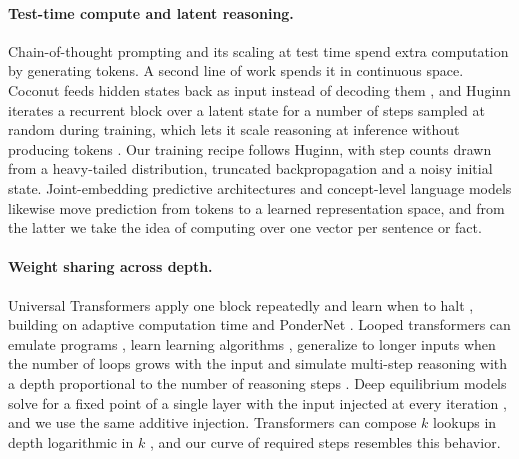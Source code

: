 \documentclass{article}
\begin{document}
\paragraph{Test-time compute and latent reasoning.} Chain-of-thought prompting \cite{wei2022chain} and its scaling at test time \cite{snell2024scaling} spend extra computation by generating tokens. A second line of work spends it in continuous space. Coconut feeds hidden states back as input instead of decoding them \cite{hao2024coconut}, and Huginn iterates a recurrent block over a latent state for a number of steps sampled at random during training, which lets it scale reasoning at inference without producing tokens \cite{geiping2025scaling}. Our training recipe follows Huginn, with step counts drawn from a heavy-tailed distribution, truncated backpropagation and a noisy initial state. Joint-embedding predictive architectures \cite{lecun2022path, assran2023ijepa} and concept-level language models \cite{barrault2024lcm} likewise move prediction from tokens to a learned representation space, and from the latter we take the idea of computing over one vector per sentence or fact.

\paragraph{Weight sharing across depth.} Universal Transformers apply one block repeatedly and learn when to halt \cite{dehghani2019universal}, building on adaptive computation time \cite{graves2016adaptive} and PonderNet \cite{banino2021pondernet}. Looped transformers can emulate programs \cite{giannou2023looped}, learn learning algorithms \cite{yang2024looped}, generalize to longer inputs when the number of loops grows with the input \cite{fan2024looped} and simulate multi-step reasoning with a depth proportional to the number of reasoning steps \cite{saunshi2025reasoning}. Deep equilibrium models solve for a fixed point of a single layer with the input injected at every iteration \cite{bai2019deq}, and we use the same additive injection. Transformers can compose $k$ lookups in depth logarithmic in $k$ \cite{sanford2024logdepth}, and our curve of required steps resembles this behavior.
\end{document}
